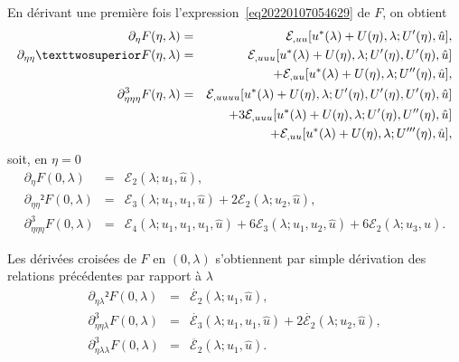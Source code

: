 \documentclass[12pt, final]{amsart}
\begin{document}
En dérivant une première fois l'expression~\eqref{eq20220107054629} de \(F\),
on obtient
\begin{eqnarray}
  \partial _\eta F(\eta , \lambda )
  &=&\mathcal E_{,uu}[u^*(\lambda )+U(\eta ), \lambda ; U'(\eta ), \hat{u}],\\
  \notag
  \partial _{\eta \eta }²F(\eta , \lambda )
  &=&\mathcal E_{,uuu}[u^*(\lambda )+U(\eta ), \lambda ; U'(\eta ), U'(\eta ), \hat{u}]\\
  &&+\mathcal E_{,uu}[u^*(\lambda )+U(\eta ), \lambda ; U''(\eta ), \hat{u}],\\
  \notag
  \partial _{\eta \eta \eta }^3F(\eta , \lambda )
  &=&\mathcal E_{,uuuu}[u^*(\lambda )+U(\eta ), \lambda ;U'(\eta ), U'(\eta ), U'(\eta ), \hat{u}]\\
  \notag
  &&+3\mathcal E_{,uuu}[u^*(\lambda )+U(\eta ), \lambda ;U'(\eta ), U''(\eta ), \hat{u}]\\
  &&+\mathcal E_{,uu}[u^*(\lambda )+U(\eta ), \lambda ;U'''(\eta ), \hat{u}],
\end{eqnarray}
soit, en \(\eta =0\)
\begin{eqnarray}
  \partial _\eta  F(0, \lambda )
  &=&\mathcal E_2(\lambda ; u_1, \hat{u}),\\
  \partial _{\eta \eta }²F(0, \lambda )
  &=&\mathcal E_3(\lambda ; u_1, u_1, \hat{u})+2\mathcal E_2(\lambda ; u_2, \hat{u}),\\
  \partial _{\eta \eta \eta }^3F(0, \lambda )
  &=&\mathcal E_4(\lambda ; u_1, u_1, u_1, \hat{u})+6\mathcal E_3(\lambda ; u_1, u_2, \hat{u})+6\mathcal E_2(\lambda ; u_3, \hat{u}).
\end{eqnarray}

Les dérivées croisées de \(F\) en \((0, \lambda )\) s'obtiennent par simple dérivation
des relations précédentes par rapport à \(\lambda \)
\begin{eqnarray}
  \partial _{\eta \lambda }²F(0, \lambda )&=&\dot{\mathcal E_2}(\lambda ; u_1, \hat{u}),\\
  \partial _{\eta \eta \lambda }^3F(0, \lambda )&=&\dot{\mathcal E_3}(\lambda ; u_1, u_1, \hat{u})+2\dot{\mathcal E_2}(\lambda ; u_2, \hat{u}),\\
  \partial _{\eta \lambda \lambda }^3F(0, \lambda )&=&\ddot{\mathcal E_2}(\lambda ; u_1, \hat{u}).
\end{eqnarray}
\end{document}
